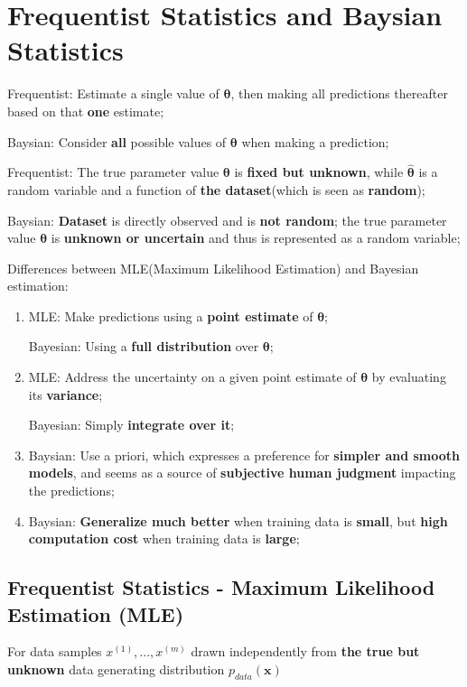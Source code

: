 \documentclass[12pt]{article}
\numberwithin{equation}{section}
\begin{document}
\section{Frequentist Statistics and Baysian Statistics}
Frequentist: Estimate a single value of $\boldsymbol\theta$, then making all predictions 
thereafter based on that \textbf{one} estimate;

Baysian: Consider \textbf{all} possible values of $\boldsymbol\theta$ when making a prediction;

Frequentist: The true parameter value $\boldsymbol\theta$ is \textbf{fixed but unknown}, while $\hat{\boldsymbol\theta}$ is a random variable and a function of \textbf{the dataset}(which is seen as \textbf{random});

Baysian: \textbf{Dataset} is directly observed and is \textbf{not random}; the true parameter value $\boldsymbol\theta$ is \textbf{unknown or uncertain} and thus is represented as a random variable;

Differences between MLE(Maximum Likelihood Estimation) and Bayesian estimation:
\begin{enumerate}
	\item MLE: Make predictions using a \textbf{point estimate} of $\boldsymbol\theta$;
	
	Bayesian: Using a \textbf{full distribution} over $\boldsymbol\theta$;
	\item MLE: Address the uncertainty on a given point estimate of $\boldsymbol\theta$ by evaluating its \textbf{variance};
	
	Bayesian: Simply \textbf{integrate over it};
	\item Baysian: Use a priori, which expresses a preference for \textbf{simpler and smooth models}, and seems as a source of \textbf{subjective human judgment} impacting the predictions;
	\item Baysian: \textbf{Generalize much better} when training data is \textbf{small}, but \textbf{high computation cost} when training data is \textbf{large};
\end{enumerate}

\subsection{Frequentist Statistics - Maximum Likelihood Estimation (MLE)}
For data samples ${x^{(1)},...,x^{(m)}}$ drawn independently from \textbf{the true but unknown} data generating distribution $p_{data}(\boldsymbol{x})$
\end{document}

